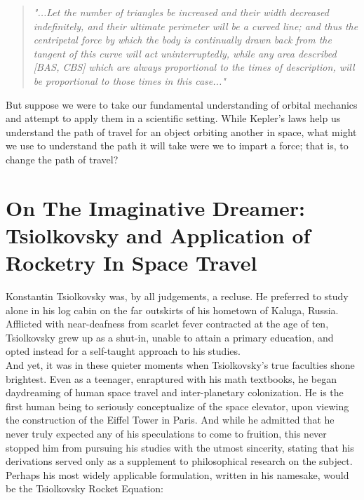 \documentclass{article}
\begin{document}
\begin{quote}
    \textit{"...Let the number of triangles be increased and their width decreased indefinitely, and their ultimate perimeter will be a curved line; and thus the centripetal force by which the body is continually drawn back from the tangent of this curve will act uninterruptedly, while any area described [BAS, CBS] which are always proportional to the times of description, will be proportional to those times in this case..."} \cite{historyofmathematics}
\end{quote}

But suppose we were to take our fundamental understanding of orbital mechanics and attempt to apply them in a scientific setting. While Kepler’s laws help us understand the path of travel for an object orbiting another in space, what might we use to understand the path it will take were we to impart a force; that is, to change the path of travel?

\section{On The Imaginative Dreamer: Tsiolkovsky and Application of Rocketry In Space Travel}

Konstantin Tsiolkovsky was, by all judgements, a recluse. He preferred to study alone in his log cabin on the far outskirts of his hometown of Kaluga, Russia. Afflicted with near-deafness from scarlet fever contracted at the age of ten, Tsiolkovsky grew up as a shut-in, unable to attain a primary education, and opted instead for a self-taught approach to his studies. \\

And yet, it was in these quieter moments when Tsiolkovsky's true faculties shone brightest. Even as a teenager, enraptured with his math textbooks, he began daydreaming of human space travel and inter-planetary colonization. He is the first human being to seriously conceptualize of the space elevator, upon viewing the construction of the Eiffel Tower in Paris. \cite{elevator} And while he admitted that he never truly expected any of his speculations to come to fruition, this never stopped him from pursuing his studies with the utmost sincerity, stating that his derivations served only as a supplement to philosophical research on the subject.  \\

Perhaps his most widely applicable formulation, written in his namesake, would be the Tsiolkovsky Rocket Equation: \cite{rocket}
\end{document}
